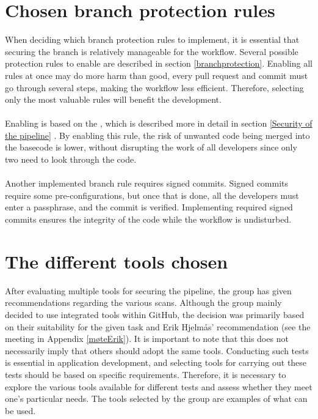 \section{Chosen branch protection rules}
When deciding which branch protection rules to implement, it is essential that securing the branch is relatively manageable for the workflow. Several possible protection rules to enable are described in section \ref{branchprotection}. Enabling all rules at once may do more harm than good, every pull request and commit must go through several steps, making the workflow less efficient. Therefore, selecting only the most valuable rules will benefit the development. 
\\~\\
Enabling  is based on the , which is described more in detail in section \ref{Security of the pipeline} \cite{foureyes}. By enabling this rule, the risk of unwanted code being merged into the basecode is lower, without disrupting the work of all developers since only two need to look through the code. 
\\~\\
Another implemented branch rule requires signed commits. Signed commits require some pre-configurations, but once that is done, all the developers must enter a passphrase, and the commit is verified. Implementing required signed commits ensures the integrity of the code while the workflow is undisturbed.

\section{The different tools chosen}
After evaluating multiple tools for securing the pipeline, the group has given recommendations regarding the various scans. Although the group mainly decided to use integrated tools within GitHub, the decision was primarily based on their suitability for the given task and Erik Hjelmås' recommendation (see the meeting in Appendix \ref{møteErik}). It is important to note that this does not necessarily imply that others should adopt the same tools. Conducting such tests is essential in application development, and selecting tools for carrying out these tests should be based on specific requirements. Therefore, it is necessary to explore the various tools available for different tests and assess whether they meet one's particular needs. The tools selected by the group are examples of what can be used. 

